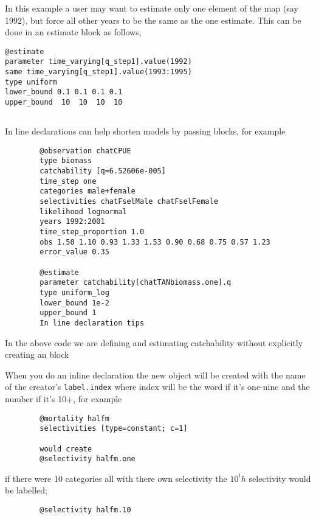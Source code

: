 In this example a user may want to estimate only one element of the map (say 1992), but force all other years to be the same as the one estimate. This can be done in an estimate block as follows,
{\small{\begin{verbatim}
@estimate
parameter time_varying[q_step1].value(1992)
same time_varying[q_step1].value(1993:1995)
type uniform
lower_bound 0.1 0.1 0.1 0.1
upper_bound  10  10  10  10 
\end{verbatim}}}
\subsection{\label{sec:declare}}
In line declarations can help shorten models by passing \command{} blocks, for example 
{\small{\begin{verbatim}
		@observation chatCPUE
		type biomass
		catchability [q=6.52606e-005]
		time_step one
		categories male+female
		selectivities chatFselMale chatFselFemale
		likelihood lognormal
		years 1992:2001
		time_step_proportion 1.0
		obs 1.50 1.10 0.93 1.33 1.53 0.90 0.68 0.75 0.57 1.23
		error_value 0.35
		
		@estimate 
		parameter catchability[chatTANbiomass.one].q
		type uniform_log
		lower_bound 1e-2
		upper_bound 1
		In line declaration tips
		\end{verbatim}}}

In the above code we are defining and estimating catchability without explicitly creating an  block


When you do an inline declaration the new object will be created with the name of the creator's \texttt{label.index}
where index will be the word if it's one-nine and the number if it's 10+, for example
{\small{\begin{verbatim}
		@mortality halfm
		selectivities [type=constant; c=1]
		
		would create
		@selectivity halfm.one
		\end{verbatim}}}

if there were 10 categories all with there own selectivity the $10^th$ selectivity would be labelled;

{\small{\begin{verbatim}
		@selectivity halfm.10
		\end{verbatim}}}